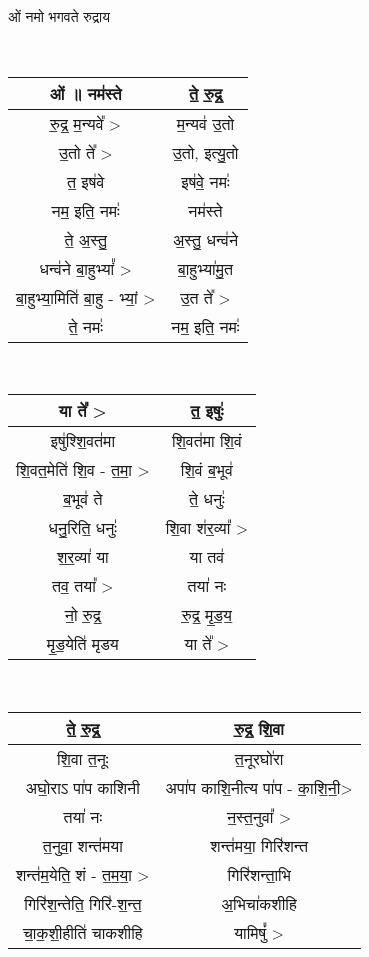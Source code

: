 \subsection{}
ओं नमो भगवते रुद्राय\\
{\centering
{\small {}} \\
\begin{longtable}{|c|c|}
\hline  
ओं ॥  नम॑स्ते                & ते॒ रु॒द्र॒\\
\hline
रु॒द्र॒ म॒न्यवे᳚ >               & म॒न्यव॑ उ॒तो\\
\hline
उ॒तो ते᳚ >                  & उ॒तो, इत्यु॒तो\\
\hline
त॒ इष॑वे                    & इष॑वे॒ नमः॑\\
\hline
नम॒ इति॒ नमः॑               & नम॑स्ते\\
\hline
ते॒ अ॒स्तु॒                    & अ॒स्तु॒ धन्व॑ने\\
\hline
धन्व॑ने बा॒हुभ्यां᳚ >            & बा॒हुभ्या॑मु॒त\\
\hline
बा॒हुभ्या॒मिति॑ बा॒हु - भ्यां॒ >   & उ॒त ते᳚ >\\
\hline
ते॒ नमः॑                    & नम॒ इति॒ नमः॑\\
\hline
\end{longtable}
}
{\centering
{\small {}} \\
\begin{longtable}{|c|c|}
\hline
या ते᳚ >                   & त॒ इषुः॑\\
\hline
इषु॑श्शि॒वत॑मा                & शि॒वत॑मा शि॒वं\\
\hline
शि॒वत॒मेति॑ शि॒व - त॒मा॒ >      & शि॒वं ब॒भूव॑\\
\hline
ब॒भूव॑ ते                    & ते॒ धनुः॑\\
\hline
धनु॒रिति॒ धनुः॑               & शि॒वा श॑र॒व्या᳚ >\\
\hline
श॒र॒व्या॑ या                 & या तव॑\\
\hline
तव॒ तया᳚ >                 & तया॑ नः\\
\hline
नो॒ रु॒द्र॒                   & रु॒द्र॒ मृ॒ड॒य॒\\
\hline
मृ॒ड॒येति॑ मृडय                & या ते᳚ >\\
\hline
\end{longtable}
}
{\centering
{\small {}} \\
\begin{longtable}{|c|c|}
\hline
ते॒ रु॒द्र॒                    & रु॒द्र॒ शि॒वा\\
\hline
शि॒वा त॒नूः                 & त॒नूरघो॑रा\\
\hline
अघो॒राऽ पा॑प काशिनी         & अपा॑प काशि॒नीत्य पा॑प - का॒शि॒नी॒>\\
\hline
तया॑ नः                   & न॒स्त॒नुवा᳚ >\\
\hline
त॒नुवा॒ शन्त॑मया              & शन्त॑मया॒ गिरि॑शन्त\\
\hline
शन्त॑म॒येति॒ शं - त॒म॒या॒ >       & गिरि॑शन्ता॒भि\\
\hline
गिरि॑श॒न्तेति॒ गिरि॑-श॒न्त॒       & अ॒भिचा॑कशीहि\\
\hline
चा॒क॒शी॒हीति॑ चाकशीहि        & यामिषुं᳚ >\\
\hline
\end{longtable}
}
